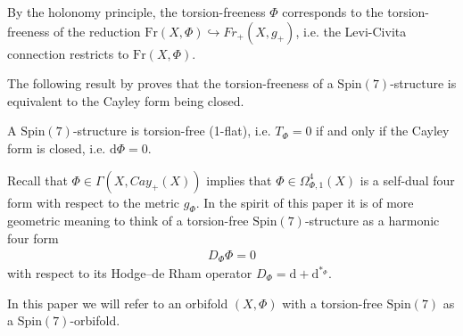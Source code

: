 \documentclass[psamsfonts]{amsart}
\theoremstyle{plain}
\theoremstyle{definition}{
\newtheorem{defi}{Definition}[section]
\newtheorem{ass}{Assumption}
\newtheorem*{nota}{Notation}}
\theoremstyle{remark}{
\newtheorem{rem}{Remark}
\newtheorem{ex}{Example}}
\theoremstyle{plain}{
\newtheorem{thm}{Theorem}[section]
\newtheorem{lem}{Lemma}[section]
\newtheorem{cor}{Corollary}[section]
\newtheorem{prop}{Proposition}[section]
\newtheorem{con}{Conjecture}[section]}
\newcommand{\m}[1]{{\mathrm{#1}}}
\newcommand{\und}[1]{\hspace{#1}\text{and}\hspace{#1}}
\begin{document}
\begin{rem}
    By the holonomy principle, the torsion-freeness $\Phi$ corresponds to the torsion-freeness of the reduction $\m{Fr}(X,\Phi)\hookrightarrow Fr_+(X,g_+)$, i.e. the Levi-Civita connection restricts to $\m{Fr}(X,\Phi)$.
\end{rem}

The following result by \cite{Fernandez1986} proves that the torsion-freeness of a $\m{Spin}(7)$-structure is equivalent to the Cayley form being closed. 

\begin{thm}\cite[Thm. 5.3]{Fernandez1986}\cite[Thm. 2]{bryant1987}
\label{torsionfreeequalclosedness}
    A $\m{Spin}(7)$-structure is torsion-free (1-flat), i.e. $T_\Phi=0$ if and only if the Cayley form is closed, i.e. $\m{d}\Phi=0$.
\end{thm}


Recall that $\Phi\in \Gamma(X,Cay_+(X))$ implies that $\Phi\in \Omega^4_{\Phi,1}(X)$ is a self-dual four form with respect to the metric $g_\Phi$. In the spirit of this paper it is of more geometric meaning to think of a torsion-free $\m{Spin}(7)$-structure as a harmonic four form
\begin{align}
\label{DPhiPhi}
    D_\Phi\Phi=0
\end{align}
with respect to its Hodge--de Rham operator $D_\Phi=\m{d}+\m{d}^{*_\Phi}$. 

\begin{nota}
    In this paper we will refer to an orbifold $(X,\Phi)$ with a torsion-free $\m{Spin}(7)$ as a $\m{Spin}(7)$-orbifold.
\end{nota}






\end{document}
